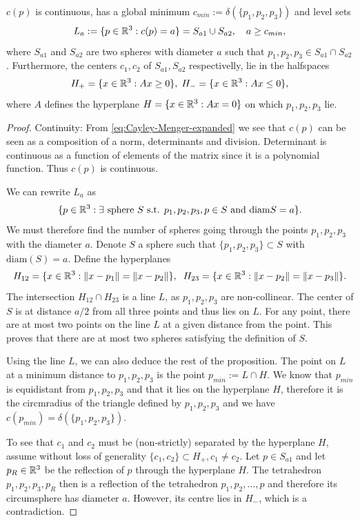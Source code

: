 \begin{lemma} $c(p)$ is continuous, has a global minimum $c_{min} := \delta(\{p_1,p_2,p_3\})$ and level sets 
	$$L_a := \{p \in {\mathbb R^3}: c(p)=a\} = S_{a1} \cup S_{a2}, \quad a \geq c_{min},$$ 
	where $S_{a1}$ and $S_{a2}$ are two spheres with diameter $a$ such that $p_1,p_2,p_3 \in S_{a1}\cap S_{a2}$. Furthermore, the centers $c_1, c_2$ of $S_{a1},S_{a2}$ respectivelly, lie in the halfspaces
$$H_+ = \{x \in {\mathbb R^3}: Ax \geq 0 \},\; H_- = \{x \in {\mathbb R^3}: Ax \leq 0\},$$
where $A$ defines the hyperplane $H=\{x\in{\mathbb R^3}: Ax = 0\}$ on which $p_1,p_2,p_3$ lie.
\end{lemma}
\begin{proof}
	Continuity: From \ref{eq:Cayley-Menger-expanded} we see that $c(p)$ can be seen as a composition of a norm, determinants and division. Determinant is continuous as a function of elements of the matrix since it is a polynomial function. Thus $c(p)$ is continuous.\newline

\noindent We can rewrite $L_a$ as
$$\{p \in {\mathbb R^3}: \exists \text{ sphere } S \text{ s.t. } p_1,p_2,p_3,p \in S \text{ and diam}S = a\}.$$
We must therefore find the number of spheres going through the points $p_1,p_2,p_3$ with the diameter $a$. Denote $S$ a sphere such that $\{p_1,p_2,p_3\}\subset S$ with $\mathrm{diam}(S)=a$. Define the hyperplanes
$$H_{12} = \{x\in{\mathbb R^3}: \|x-p_1\| = \|x-p_2\|\}, \;\; H_{23} = \{x\in{\mathbb R^3}: \|x-p_2\|=\|x-p_3\|\}.$$
The intersection $H_{12}\cap H_{23}$ is a line $L$, as $p_1,p_2,p_3$ are non-collinear.  The center of $S$ is at distance $a/2$ from all three points and thus lies on $L$. For any point, there are at most two points on the line $L$ at a given distance from the point. This proves that there are at most two spheres satisfying the definition of $S$.

Using the line $L$, we can also deduce the rest of the proposition. The point on $L$ at a minimum distance to $p_1,p_2,p_3$ is the point $p_{min}:=L\cap H$. We know that $p_{min}$ is equidistant from $p_1,p_2,p_3$ and that it lies on the hyperplane $H$, therefore it is the circmradius of the triangle defined by $p_1,p_2,p_3$ and we have $c(p_{min}) = \delta(\{p_1,p_2,p_3\})$.  

To see that $c_1$ and $c_2$ must be (non-strictly) separated by the hyperplane $H$, assume without loss of generality $\{c_1,c_2\}\subset H_+, c_1\neq c_2$. Let $p \in S_{a1}$ and let  $p_R\in {\mathbb R^3}$ be the reflection of $p$ through the hyperplane $H$. The tetrahedron $p_1,p_2,p_3,p_R$ then is a reflection of the tetrahedron $p_1,p_2,\dots, p$ and therefore its circumsphere has diameter $a$. However, its centre lies in $H_-$, which is a contradiction. 
\end{proof}

